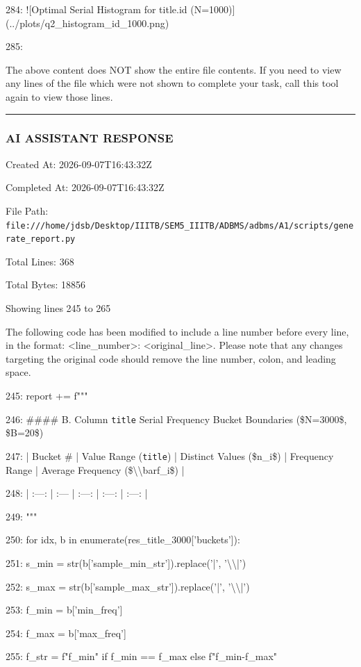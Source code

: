 \documentclass[11pt,a4paper]{article}
\begin{document}
284: ![Optimal Serial Histogram for title.id (N=1000)](../plots/q2\_histogram\_id\_1000.png)

285:

The above content does NOT show the entire file contents. If you need to view any lines of the file which were not shown to complete your task, call this tool again to view those lines.


\hrule

\subsubsection{AI ASSISTANT RESPONSE}

Created At: 2026-09-07T16:43:32Z

Completed At: 2026-09-07T16:43:32Z

File Path: \texttt{file:///home/jdsb/Desktop/IIITB/SEM5\_IIITB/ADBMS/adbms/A1/scripts/generate\_report.py}

Total Lines: 368

Total Bytes: 18856

Showing lines 245 to 265

The following code has been modified to include a line number before every line, in the format: <line\_number>: <original\_line>. Please note that any changes targeting the original code should remove the line number, colon, and leading space.

245:     report += f"""

246: \#\#\#\# B. Column \texttt{title} Serial Frequency Bucket Boundaries (\$N=3000\$, \$B=20\$)

247: | Bucket \# | Value Range (\texttt{title}) | Distinct Values (\$n\_i\$) | Frequency Range | Average Frequency (\$\textbackslash{}\textbackslash{}bar{{f}}\_i\$) |

248: | :---: | :--- | :---: | :---: | :---: |

249: """

250:     for idx, b in enumerate(res\_title\_3000['buckets']):

251:         s\_min = str(b['sample\_min\_str']).replace('|', '\textbackslash{}\textbackslash{}|')

252:         s\_max = str(b['sample\_max\_str']).replace('|', '\textbackslash{}\textbackslash{}|')

253:         f\_min = b['min\_freq']

254:         f\_max = b['max\_freq']

255:         f\_str = f"{f\_min}" if f\_min == f\_max else f"{f\_min}-{f\_max}"
\end{document}
